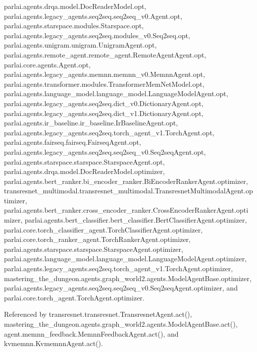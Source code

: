 parlai.\+agents.\+drqa.\+model.\+Doc\+Reader\+Model.\+opt, parlai.\+agents.\+legacy\+\_\+agents.\+seq2seq.\+seq2seq\+\_\+v0.\+Agent.\+opt, parlai.\+agents.\+starspace.\+modules.\+Starspace.\+opt, parlai.\+agents.\+legacy\+\_\+agents.\+seq2seq.\+modules\+\_\+v0.\+Seq2seq.\+opt, parlai.\+agents.\+unigram.\+unigram.\+Unigram\+Agent.\+opt, parlai.\+agents.\+remote\+\_\+agent.\+remote\+\_\+agent.\+Remote\+Agent\+Agent.\+opt, parlai.\+core.\+agents.\+Agent.\+opt, parlai.\+agents.\+legacy\+\_\+agents.\+memnn.\+memnn\+\_\+v0.\+Memnn\+Agent.\+opt, parlai.\+agents.\+transformer.\+modules.\+Transformer\+Mem\+Net\+Model.\+opt, parlai.\+agents.\+language\+\_\+model.\+language\+\_\+model.\+Language\+Model\+Agent.\+opt, parlai.\+agents.\+legacy\+\_\+agents.\+seq2seq.\+dict\+\_\+v0.\+Dictionary\+Agent.\+opt, parlai.\+agents.\+legacy\+\_\+agents.\+seq2seq.\+dict\+\_\+v1.\+Dictionary\+Agent.\+opt, parlai.\+agents.\+ir\+\_\+baseline.\+ir\+\_\+baseline.\+Ir\+Baseline\+Agent.\+opt, parlai.\+agents.\+legacy\+\_\+agents.\+seq2seq.\+torch\+\_\+agent\+\_\+v1.\+Torch\+Agent.\+opt, parlai.\+agents.\+fairseq.\+fairseq.\+Fairseq\+Agent.\+opt, parlai.\+agents.\+legacy\+\_\+agents.\+seq2seq.\+seq2seq\+\_\+v0.\+Seq2seq\+Agent.\+opt, parlai.\+agents.\+starspace.\+starspace.\+Starspace\+Agent.\+opt, parlai.\+agents.\+drqa.\+model.\+Doc\+Reader\+Model.\+optimizer, parlai.\+agents.\+bert\+\_\+ranker.\+bi\+\_\+encoder\+\_\+ranker.\+Bi\+Encoder\+Ranker\+Agent.\+optimizer, transresnet\+\_\+multimodal.\+transresnet\+\_\+multimodal.\+Transresnet\+Multimodal\+Agent.\+optimizer, parlai.\+agents.\+bert\+\_\+ranker.\+cross\+\_\+encoder\+\_\+ranker.\+Cross\+Encoder\+Ranker\+Agent.\+optimizer, parlai.\+agents.\+bert\+\_\+classifier.\+bert\+\_\+classifier.\+Bert\+Classifier\+Agent.\+optimizer, parlai.\+core.\+torch\+\_\+classifier\+\_\+agent.\+Torch\+Classifier\+Agent.\+optimizer, parlai.\+core.\+torch\+\_\+ranker\+\_\+agent.\+Torch\+Ranker\+Agent.\+optimizer, parlai.\+agents.\+starspace.\+starspace.\+Starspace\+Agent.\+optimizer, parlai.\+agents.\+language\+\_\+model.\+language\+\_\+model.\+Language\+Model\+Agent.\+optimizer, parlai.\+agents.\+legacy\+\_\+agents.\+seq2seq.\+torch\+\_\+agent\+\_\+v1.\+Torch\+Agent.\+optimizer, mastering\+\_\+the\+\_\+dungeon.\+agents.\+graph\+\_\+world2.\+agents.\+Model\+Agent\+Base.\+optimizer, parlai.\+agents.\+legacy\+\_\+agents.\+seq2seq.\+seq2seq\+\_\+v0.\+Seq2seq\+Agent.\+optimizer, and parlai.\+core.\+torch\+\_\+agent.\+Torch\+Agent.\+optimizer.



Referenced by transresnet.\+transresnet.\+Transresnet\+Agent.\+act(), mastering\+\_\+the\+\_\+dungeon.\+agents.\+graph\+\_\+world2.\+agents.\+Model\+Agent\+Base.\+act(), agent.\+memnn\+\_\+feedback.\+Memnn\+Feedback\+Agent.\+act(), and kvmemnn.\+Kvmemnn\+Agent.\+act().

